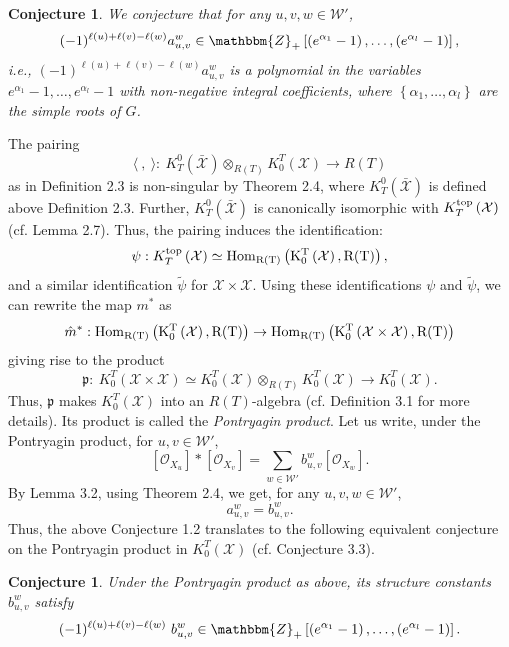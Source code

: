 \documentclass{article}
\newtheorem{conjecture}[theorem]{Conjecture}
\def\X{\mathcal{X}}
\def\W{\mathcal{W}}
\def\mathbb{\mathbbm}
\def\p{\mathfrak{p}}
\def\ref#1{#1}
\def\top{\rm{top}}
\def\Hom{\rm{Hom}}
\begin{document}
\begin{conjecture}\label{1.2}
We conjecture that for any $u,v,w\in\W'$, 
$$
(-1)^{\ell(u)+\ell(v)-\ell(w)} a^w_{u,v}\in \mathbb{Z}_+\left[\left(e^{\alpha_1}-1\right), \ldots , \left(e^{\alpha_l}-1\right)\right],
$$
 i.e., $(-1)^{\ell(u)+\ell(v)-\ell(w)} a^w_{u,v}$ is a polynomial in the variables $e^{\alpha_1}-1,\ldots, e^{\alpha_l}-1$ with non-negative integral coefficients, where $\left\{\alpha_1,\ldots,\alpha_l\right\}$ are the simple roots of $G$. 
\end{conjecture}
The pairing 
$$
\langle ~,~\rangle: ~ K^0_T\left(\bar{\X}\right) \otimes_{R(T)}  K_0^T\left({\X}\right) \rightarrow R(T)
$$
as in Definition \ref{2.3} is non-singular by Theorem \ref{2.4}, where $K^0_T\left(\bar{\X}\right)$ is defined above Definition \ref{2.3}. Further, 
$ K^0_T\left(\bar{\X}\right)$ is canonically isomorphic with $ 
 K^{\top}_T \left(\X\right)$ (cf. Lemma \ref{2.7}).
Thus, the pairing  induces the identification: 
$$
\psi :  K^{\top}_T\left({\X}\right) \simeq \Hom_{R(T)} \left(K_0^T\left({\X}\right) ,R(T)\right),
$$
and a similar identification $\tilde{\psi}$ for $\X\times \X$. 
Using these identifications $\psi$ and $\tilde{\psi}$, we can rewrite the map ${m}^*$ as 
$$
\hat{m}^*:\Hom_{R(T)} \left(K_0^T\left({\X}\right) ,R(T)\right) \rightarrow \Hom_{R(T)} \left(K_0^{T}\left(\X\times \X\right) ,R(T)\right)
$$
giving rise to the product 
$$
{\p}:~K_0^{T}\left(\X\times \X\right) \simeq K^T_0\left({\X}\right) \otimes_{R(T)} K_0^T\left({\X}\right) \rightarrow K_0^T\left({\X}\right).
$$
Thus, $\p$ makes $K_0^T\left({\X}\right)$ into an $R(T)$-algebra (cf. Definition \ref{3.1} for more details). Its product is called the {\it Pontryagin product}. Let us write,  under the Pontryagin product, 
for $u,v \in \W'$,
\begin{equation*}
\left[\mathcal{O}_{X_u}\right]* \left[\mathcal{O}_{X_v}\right]= \sum_{ w\in \W'}b_{u,v}^w\left [\mathcal{O}_{X_w}\right]. 
\end{equation*}
By  Lemma \ref{3.2}, using
Theorem \ref{2.4}, we get,  for any $u,v,w\in\W'$, 
$$
a_{u,v}^w = b_{u,v}^w.
$$
Thus, the above Conjecture \ref{1.2}  translates to the following equivalent conjecture on the Pontryagin product in $K_0^T\left({\X}\right)$ (cf. Conjecture \ref{3.3}). 
\begin{conjecture} \label{1.3} Under the Pontryagin product as above, its structure constants $b_{u,v}^w$ satisfy 
$$
(-1)^{ \ell(u)+\ell(v)-\ell(w)}
\,\,b_{u,v}^w \in \mathbbm{Z}_+ \left[\left(e^{\alpha_1}-1\right), \ldots , \left(e^{\alpha_l}-1\right)\right].
$$
\end{conjecture}
\end{document}
